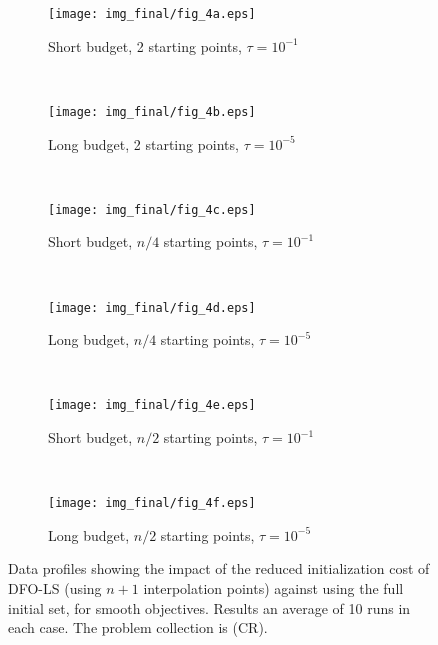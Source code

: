 \begin{figure}
	\centering
	\begin{subfigure}[b]{0.48\textwidth}
		\texttt{[image: img\_final/fig\_4a.eps]}
		\caption{Short budget, 2 starting points, $\tau=10^{-1}$}
		\label{fig_growing_smooth_easy}
	\end{subfigure}
	~
	\begin{subfigure}[b]{0.48\textwidth}
		\texttt{[image: img\_final/fig\_4b.eps]}
		\caption{Long budget, 2 starting points, $\tau=10^{-5}$}
		\label{fig_growing_smooth_hard}
	\end{subfigure}
	\\
	\begin{subfigure}[b]{0.48\textwidth}
		\texttt{[image: img\_final/fig\_4c.eps]}
		\caption{Short budget, $n/4$ starting points, $\tau=10^{-1}$}
		\label{fig_growing_qtrn_smooth_easy}
	\end{subfigure}
	~
	\begin{subfigure}[b]{0.48\textwidth}
		\texttt{[image: img\_final/fig\_4d.eps]}
		\caption{Long budget, $n/4$ starting points, $\tau=10^{-5}$}
		\label{fig_growing_qtrn_smooth_hard}
	\end{subfigure}
	\\
	\begin{subfigure}[b]{0.48\textwidth}
		\texttt{[image: img\_final/fig\_4e.eps]}
		\caption{Short budget, $n/2$ starting points, $\tau=10^{-1}$}
		\label{fig_growing_halfn_smooth_easy}
	\end{subfigure}
	~
	\begin{subfigure}[b]{0.48\textwidth}
		\texttt{[image: img\_final/fig\_4f.eps]}
		\caption{Long budget, $n/2$ starting points, $\tau=10^{-5}$}
		\label{fig_growing_halfn_smooth_hard}
	\end{subfigure}
	\caption{Data profiles showing the impact of the reduced initialization cost of DFO-LS (using $n+1$ interpolation points) against using the full initial set, for smooth objectives. Results an average of 10 runs in each case. The problem collection is (CR).}
	\label{fig_growing_smooth}
\end{figure}

